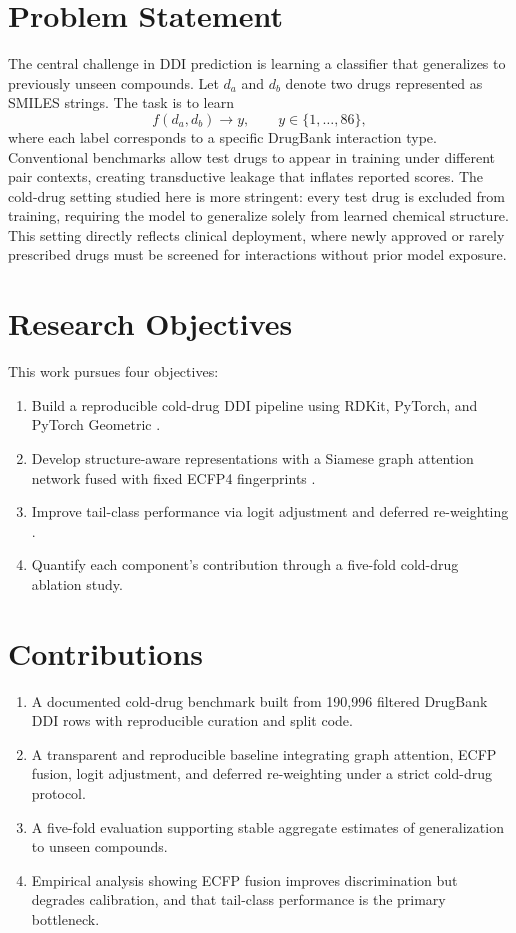 \documentclass[11pt,a4paper]{report}
\begin{document}
\section{Problem Statement}

The central challenge in DDI prediction is learning a classifier that generalizes to previously unseen compounds. Let $d_a$ and $d_b$ denote two drugs represented as SMILES strings. The task is to learn
\begin{equation}
f(d_a, d_b) \rightarrow y, \qquad y \in \{1,\dots,86\},
\end{equation}
where each label corresponds to a specific DrugBank interaction type. Conventional benchmarks allow test drugs to appear in training under different pair contexts, creating transductive leakage that inflates reported scores. The cold-drug setting studied here is more stringent: every test drug is excluded from training, requiring the model to generalize solely from learned chemical structure. This setting directly reflects clinical deployment, where newly approved or rarely prescribed drugs must be screened for interactions without prior model exposure.

\section{Research Objectives}

This work pursues four objectives:
\begin{enumerate}
\item Build a reproducible cold-drug DDI pipeline using RDKit, PyTorch, and PyTorch Geometric \cite{fey2019pyg}.
\item Develop structure-aware representations with a Siamese graph attention network fused with fixed ECFP4 fingerprints \cite{velickovic2018gat, rogers2010ecfp}.
\item Improve tail-class performance via logit adjustment and deferred re-weighting \cite{menon2021logit, cao2019ldam}.
\item Quantify each component's contribution through a five-fold cold-drug ablation study.
\end{enumerate}

\section{Contributions}

\begin{enumerate}
\item A documented cold-drug benchmark built from 190{,}996 filtered DrugBank DDI rows with reproducible curation and split code.
\item A transparent and reproducible baseline integrating graph attention, ECFP fusion, logit adjustment, and deferred re-weighting under a strict cold-drug protocol.
\item A five-fold evaluation supporting stable aggregate estimates of generalization to unseen compounds.
\item Empirical analysis showing ECFP fusion improves discrimination but degrades calibration, and that tail-class performance is the primary bottleneck.
\end{enumerate}
\end{document}
